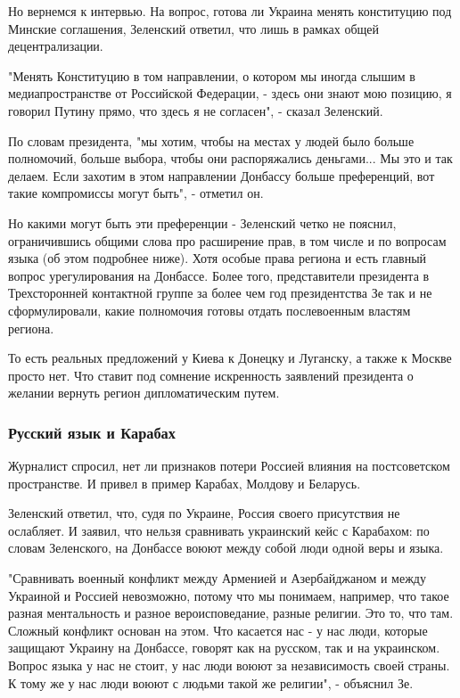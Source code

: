 {Но вернемся к интервью. На вопрос, готова ли Украина менять конституцию под
Минские соглашения, Зеленский ответил, что лишь в рамках общей децентрализации. 

"Менять Конституцию в том направлении, о котором мы иногда слышим в
медиапространстве от Российской Федерации, - здесь они знают мою позицию, я
говорил Путину прямо, что здесь я не согласен", - сказал Зеленский. 

По словам президента, "мы хотим, чтобы на местах у людей было больше
полномочий, больше выбора, чтобы они распоряжались деньгами... Мы это и так
делаем. Если захотим в этом направлении Донбассу больше преференций, вот такие
компромиссы могут быть", - отметил он. 

Но какими могут быть эти преференции - Зеленский четко не пояснил,
ограничившись общими слова про расширение прав, в том числе и по вопросам языка
(об этом подробнее ниже). Хотя особые права региона и есть главный вопрос
урегулирования на Донбассе. Более того, представители президента в
Трехсторонней контактной группе за более чем год президентства Зе так и не
сформулировали, какие полномочия готовы отдать послевоенным властям региона. 

То есть реальных предложений у Киева к Донецку и Луганску, а также к Москве
просто нет. Что ставит под сомнение искренность заявлений президента о желании
вернуть регион дипломатическим путем. 

\subsubsection{Русский язык и Карабах}

Журналист спросил, нет ли признаков потери Россией влияния на постсоветском
пространстве. И привел в пример Карабах, Молдову и Беларусь. 

Зеленский ответил, что, судя по Украине, Россия своего присутствия не
ослабляет. И заявил, что нельзя сравнивать украинский кейс с Карабахом: по
словам Зеленского, на Донбассе воюют между собой люди одной веры и языка. 

"Сравнивать военный конфликт между Арменией и Азербайджаном и между Украиной и
Россией невозможно, потому что мы понимаем, например, что такое разная
ментальность и разное вероисповедание, разные религии. Это то, что там. Сложный
конфликт основан на этом. Что касается нас - у нас люди, которые защищают
Украину на Донбассе, говорят как на русском, так и на украинском. Вопрос языка
у нас не стоит, у нас люди воюют за независимость своей страны. К тому же у нас
люди воюют с людьми такой же религии", - объяснил Зе. 

}
